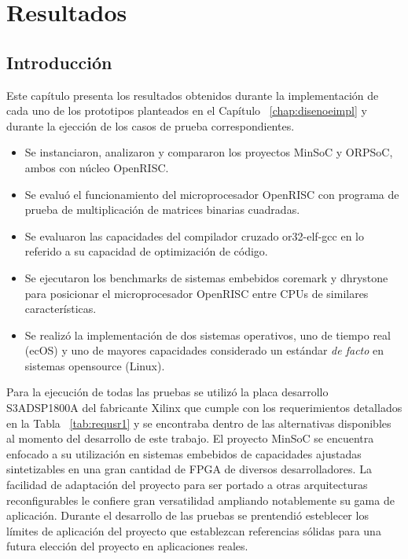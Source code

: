 \chapter{Resultados} \label {chap:resultados}
	\section{Introducción} 
	
	Este capítulo presenta los resultados obtenidos durante la implementación de cada uno de los prototipos planteados en el Capítulo
	~\ref{chap:disenoeimpl} y durante la ejección de los casos de prueba correspondientes. 
\begin{itemize}
\item Se instanciaron, analizaron y compararon los proyectos MinSoC y ORPSoC, ambos con núcleo OpenRISC. 
\item Se evaluó el funcionamiento del microprocesador OpenRISC con programa de prueba de multiplicación de matrices binarias cuadradas.
\item Se evaluaron las capacidades del compilador cruzado or32-elf-gcc en lo referido a su capacidad de optimización de código. 
\item Se ejecutaron los benchmarks de sistemas embebidos coremark y dhrystone para posicionar el microprocesador OpenRISC entre CPUs de similares
características.
\item Se realizó la implementación de dos sistemas operativos, uno de tiempo real (ecOS) y uno de mayores capacidades considerado un estándar
\textit{de facto} en sistemas opensource (Linux). 
\end{itemize}				
				
	Para la ejecución de todas las pruebas se utilizó la placa desarrollo S3ADSP1800A del fabricante Xilinx que cumple con los requerimientos detallados
	en la Tabla ~\ref{tab:requsr1} y se encontraba dentro de las alternativas disponibles al momento del desarrollo de este trabajo. El proyecto MinSoC
	se encuentra enfocado a su utilización en sistemas embebidos de capacidades ajustadas sintetizables en una gran cantidad de FPGA de diversos
	desarrolladores. La facilidad de adaptación del proyecto para ser portado a otras arquitecturas reconfigurables le confiere gran versatilidad
	ampliando notablemente su gama de aplicación. Durante el desarrollo de las pruebas se prentendió esteblecer los límites de aplicación del proyecto
	que establezcan referencias sólidas para una futura elección del proyecto en aplicaciones reales.


